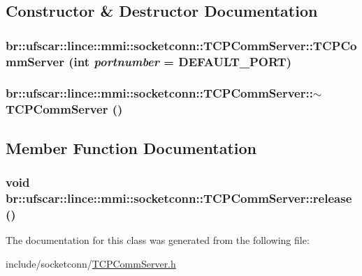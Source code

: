 \subsection{Constructor \& Destructor Documentation}
\hypertarget{classbr_1_1ufscar_1_1lince_1_1mmi_1_1socketconn_1_1TCPCommServer_a3f53b0b1078c2b1c3bf6975eddcc2bd2}{
\subsubsection[{TCPCommServer}]{\setlength{\rightskip}{0pt plus 5cm}br::ufscar::lince::mmi::socketconn::TCPCommServer::TCPCommServer (int {\em portnumber} = {\ttfamily DEFAULT\_\-PORT})}}
\label{classbr_1_1ufscar_1_1lince_1_1mmi_1_1socketconn_1_1TCPCommServer_a3f53b0b1078c2b1c3bf6975eddcc2bd2}
\hypertarget{classbr_1_1ufscar_1_1lince_1_1mmi_1_1socketconn_1_1TCPCommServer_a528689c5a4c14f578cfdc659a03f4c99}{
\subsubsection[{$\sim$TCPCommServer}]{\setlength{\rightskip}{0pt plus 5cm}br::ufscar::lince::mmi::socketconn::TCPCommServer::$\sim$TCPCommServer ()}}
\label{classbr_1_1ufscar_1_1lince_1_1mmi_1_1socketconn_1_1TCPCommServer_a528689c5a4c14f578cfdc659a03f4c99}


\subsection{Member Function Documentation}
\hypertarget{classbr_1_1ufscar_1_1lince_1_1mmi_1_1socketconn_1_1TCPCommServer_ad34949969d9e206c46e71d5f9c86c44d}{
\subsubsection[{release}]{\setlength{\rightskip}{0pt plus 5cm}void br::ufscar::lince::mmi::socketconn::TCPCommServer::release ()}}
\label{classbr_1_1ufscar_1_1lince_1_1mmi_1_1socketconn_1_1TCPCommServer_ad34949969d9e206c46e71d5f9c86c44d}


The documentation for this class was generated from the following file:\begin{DoxyCompactItemize}
\item 
include/socketconn/\hyperlink{TCPCommServer_8h}{TCPCommServer.h}\end{DoxyCompactItemize}
